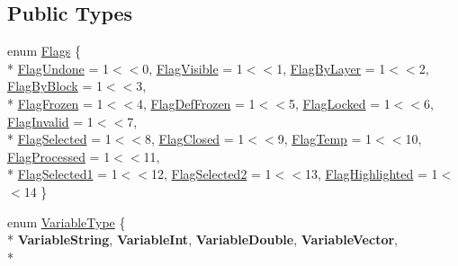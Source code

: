 \subsection*{Public Types}
\begin{DoxyCompactItemize}
\item 
enum \hyperlink{classRS2_a44c2db4b2ed0d533716a5266abafeeca}{Flags} \{ \\*
\hyperlink{classRS2_a44c2db4b2ed0d533716a5266abafeecaa9ff48e6f3b998828e8d11a1cd206afc0}{Flag\-Undone} = 1$<$$<$0, 
\hyperlink{classRS2_a44c2db4b2ed0d533716a5266abafeecaab4264f781d78cf1b2df258012ade9db1}{Flag\-Visible} = 1$<$$<$1, 
\hyperlink{classRS2_a44c2db4b2ed0d533716a5266abafeecaa5695d8e7e282ccafc07f18257da4f78b}{Flag\-By\-Layer} = 1$<$$<$2, 
\hyperlink{classRS2_a44c2db4b2ed0d533716a5266abafeecaafccfa9b8d47c85e8713a886c410c0619}{Flag\-By\-Block} = 1$<$$<$3, 
\\*
\hyperlink{classRS2_a44c2db4b2ed0d533716a5266abafeecaabc228081c0cd60b864f8c04b34968e2b}{Flag\-Frozen} = 1$<$$<$4, 
\hyperlink{classRS2_a44c2db4b2ed0d533716a5266abafeecaaabfd152e3a83c8b999e443e173cf7467}{Flag\-Def\-Frozen} = 1$<$$<$5, 
\hyperlink{classRS2_a44c2db4b2ed0d533716a5266abafeecaa0f6159550603001fce21af07b4553ad6}{Flag\-Locked} = 1$<$$<$6, 
\hyperlink{classRS2_a44c2db4b2ed0d533716a5266abafeecaa818c995d3fba5a5503def5a538f8abe4}{Flag\-Invalid} = 1$<$$<$7, 
\\*
\hyperlink{classRS2_a44c2db4b2ed0d533716a5266abafeecaaaf72e9b8b969dd44722c75afd1afc5de}{Flag\-Selected} = 1$<$$<$8, 
\hyperlink{classRS2_a44c2db4b2ed0d533716a5266abafeecaa40d93a1e22967fac3291d8886155fafc}{Flag\-Closed} = 1$<$$<$9, 
\hyperlink{classRS2_a44c2db4b2ed0d533716a5266abafeecaab25c508640c79e30edb1d720043c5d51}{Flag\-Temp} = 1$<$$<$10, 
\hyperlink{classRS2_a44c2db4b2ed0d533716a5266abafeecaa7c9021e11cd578ebc4079b0479783b9e}{Flag\-Processed} = 1$<$$<$11, 
\\*
\hyperlink{classRS2_a44c2db4b2ed0d533716a5266abafeecaad067bf696af8200ed6940950b5bb441f}{Flag\-Selected1} = 1$<$$<$12, 
\hyperlink{classRS2_a44c2db4b2ed0d533716a5266abafeecaadfae35f50ee6bac880b871226017babf}{Flag\-Selected2} = 1$<$$<$13, 
\hyperlink{classRS2_a44c2db4b2ed0d533716a5266abafeecaa342deed7b530740efa6f5db89137c50d}{Flag\-Highlighted} = 1$<$$<$14
 \}
\item 
enum \hyperlink{classRS2_af1c96c2254f823f3836e8839482870d7}{Variable\-Type} \{ \\*
{\bfseries Variable\-String}, 
{\bfseries Variable\-Int}, 
{\bfseries Variable\-Double}, 
{\bfseries Variable\-Vector}, 
\\*
$$
\end{DoxyCompactItemize}
